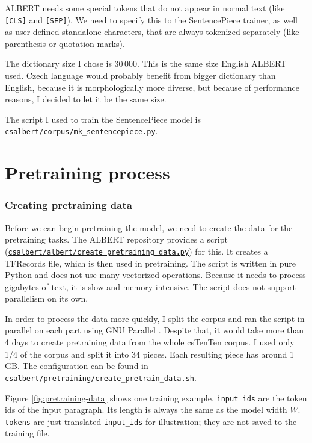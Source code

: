 \documentclass[
  printed, %
  color,   %
  table,   %
  oneside, %
  lof,     %
  lot,     %
]{fithesis3}
\begin{document}
ALBERT needs some special tokens that do not appear in normal text (like \texttt{[CLS]} and \texttt{[SEP]}). We need to specify this to the SentencePiece trainer, as well as user-defined standalone characters, that are always tokenized separately (like parenthesis or quotation marks).

The dictionary size I chose is 30\,000. This is the same size English ALBERT used. Czech language would probably benefit from bigger dictionary than English, because it is morphologically more diverse, but because of performance reasons, I decided to let it be the same size.

The script I used to train the SentencePiece model is \newline
\href{https://github.com/ZepZep/csalbert/blob/master/corpus/mk_sentencepiece.py}{\texttt{csalbert/corpus/mk\_sentencepiece.py}}.

\section{Pretraining process}
\subsubsection{Creating pretraining data}
Before we can begin pretraining the model, we need to create the data for the pretraining tasks. The ALBERT repository provides a script (\href{https://github.com/ZepZep/csalbert/blob/master/albert/create_pretraining_data.py} {\texttt{csalbert/albert/create\_pretraining\_data.py}}) for this. It creates a TFRecords file, which is then used in pretraining. The script is written in pure Python and does not use many vectorized operations. Because it needs to process gigabytes of text, it is slow and memory intensive. The script does not support parallelism on its own.

In order to process the data more quickly, I split the corpus and ran the script in parallel on each part using GNU Parallel \parencite{parallel}. Despite that, it would take more than 4 days to create pretraining data from the whole csTenTen corpus. I used only 1/4 of the corpus and split it into 34 pieces. Each resulting piece has around 1 GB. The configuration can be found in \href{https://github.com/ZepZep/csalbert/blob/master/pretraining/create_pretrain_data.sh}{\texttt{csalbert/pretraining/create\_pretrain\_data.sh}}.

Figure \ref{fig:pretraining-data} shows one training example. \texttt{input\_ids} are the token ids of the input paragraph. Its length is always the same as the model width $W$. \texttt{tokens} are just translated \texttt{input\_ids} for illustration; they are not saved to the training file.
\end{document}

